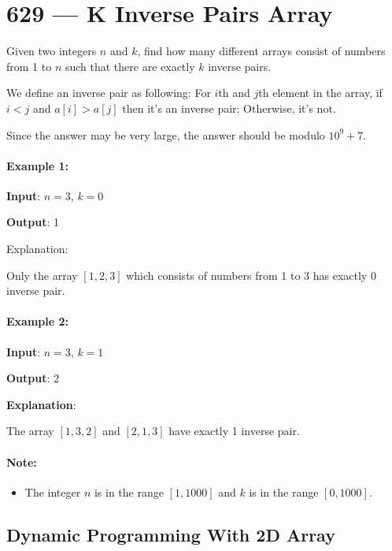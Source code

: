 \section{629 --- K Inverse Pairs Array}
Given two integers $n$ and $k$, find how many different arrays consist of numbers from 1 to $n$ such that there are exactly $k$ inverse pairs.

We define an inverse pair as following: For $i$th and $j$th element in the array, if $i < j$ and $a[i] > a[j]$ then it's an inverse pair; Otherwise, it's not.

Since the answer may be very large, the answer should be modulo $10^9 + 7$.

\paragraph{Example 1:}
\begin{flushleft}

\textbf{Input}: $n = 3$, $k = 0$

\textbf{Output}: 1

Explanation: 

Only the array $[1,2,3]$ which consists of numbers from 1 to 3 has exactly 0 inverse pair.


\end{flushleft} 

\paragraph{Example 2:}

\begin{flushleft}

\textbf{Input}: $n = 3$, $k = 1$

\textbf{Output}: 2

\textbf{Explanation}: 

The array $[1,3,2]$ and $[2,1,3]$ have exactly 1 inverse pair.

\end{flushleft} 

\paragraph{Note:}

\begin{itemize}
\item The integer $n$ is in the range $[1, 1000]$ and $k$ is in the range $[0, 1000]$.
\end{itemize}
\subsection{Dynamic Programming With 2D Array}


